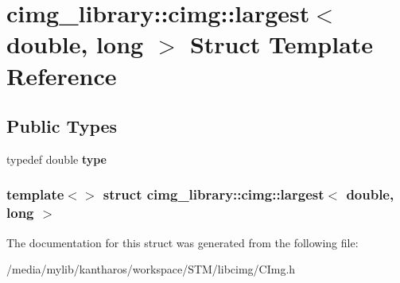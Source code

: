 \hypertarget{structcimg__library_1_1cimg_1_1largest_3_01double_00_01long_01_4}{
\section{cimg\_\-library::cimg::largest$<$ double, long $>$ Struct Template Reference}
\label{structcimg__library_1_1cimg_1_1largest_3_01double_00_01long_01_4}
}
\subsection*{Public Types}
\begin{DoxyCompactItemize}
\item 
\hypertarget{structcimg__library_1_1cimg_1_1largest_3_01double_00_01long_01_4_a5a9c02cbbc2dbfb4dc130aa5a5d0bf28}{
typedef double {\bfseries type}}
\label{structcimg__library_1_1cimg_1_1largest_3_01double_00_01long_01_4_a5a9c02cbbc2dbfb4dc130aa5a5d0bf28}

\end{DoxyCompactItemize}
\subsubsection*{template$<$$>$ struct cimg\_\-library::cimg::largest$<$ double, long $>$}



The documentation for this struct was generated from the following file:\begin{DoxyCompactItemize}
\item 
/media/mylib/kantharos/workspace/STM/libcimg/CImg.h\end{DoxyCompactItemize}
